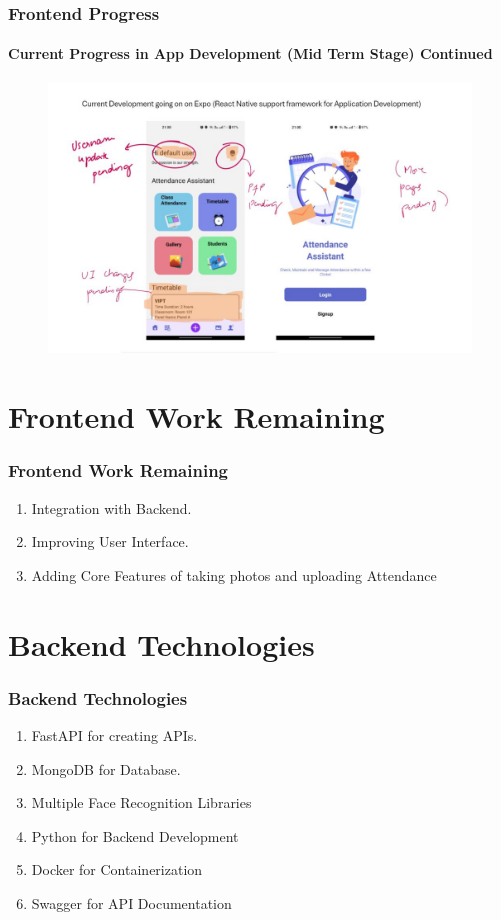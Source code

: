 \documentclass[aspectratio=169]{beamer}
\begin{document}
\begin{frame}
	\centering
	\frametitle{Frontend Progress}
	\framesubtitle{Current Progress in App Development (Mid Term Stage) Continued}
	\begin{figure}[H]
		\centering
		\includegraphics[width=.8\textwidth]{../../Frontend Status/Mid Term/frontend app status for mini proj 2.jpg}
	\end{figure}
\end{frame}

\section{Frontend Work Remaining}
\begin{frame}
	\centering
	\frametitle{Frontend Work Remaining}
	\begin{minipage}{0.95\textwidth}
		\begin{enumerate}
			\item Integration with Backend.
			\item Improving User Interface.
			\item Adding Core Features of taking photos and uploading Attendance
		\end{enumerate}
	\end{minipage}
\end{frame}

\section{Backend Technologies}
\begin{frame}
	\centering
	\frametitle{Backend Technologies}
	\begin{minipage}{0.95\textwidth}
		\begin{enumerate}
			\item FastAPI for creating APIs.
			\item MongoDB for Database.
			\item Multiple Face Recognition Libraries
			\item Python for Backend Development
			\item Docker for Containerization
			\item Swagger for API Documentation
		\end{enumerate}
	\end{minipage}
\end{frame}
\end{document}
